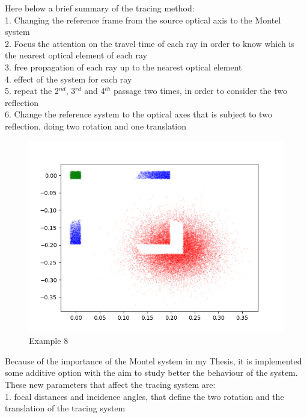 Here below a brief summary of the tracing method:
	\\ \hspace{20mm} 1. Changing the reference frame from the source optical axis to the Montel system
	\\ \hspace{20mm} 2. Focus the attention on the travel time of each ray in order to know which is the nearest optical element of each ray
	\\ \hspace{20mm} 3. free propagation of each ray up to the nearest optical element
	\\ \hspace{20mm} 4. effect of the system for each ray
	\\ \hspace{20mm} 5. repeat the 2$^{nd} $, 3$^{rd} $ and 4$^{th} $ passage two times, in order to consider the two reflection
	\\ \hspace{20mm} 6. Change the reference system to the optical axes that is subject to two reflection, doing two rotation and one translation
\begin{figure}[H]
%
\centering
%
\includegraphics[width=1.\textwidth]{Immagini/Chapter3/BigSourceMontel}
%
\caption{Example 8}
%
\label{fig: BigSourceMontel}
%
\end{figure}
\noindent Because of the importance of the Montel system in my Thesis, it is implemented some additive option with the aim to study better the behaviour of the system. These new parameters that affect the tracing system are: 
	\\ \hspace{20mm} 1. focal distances and incidence angles, that define the two rotation and the translation of the tracing system
